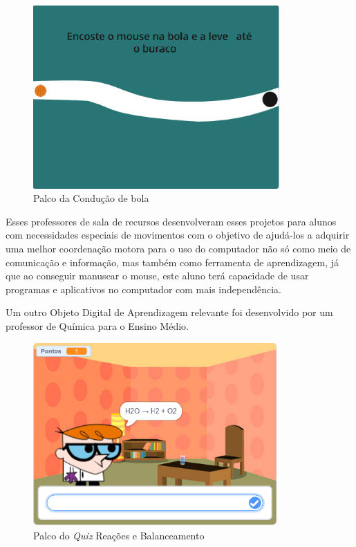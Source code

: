 \documentclass[12pt, openright, a4paper, brazil, english, french, spanish, bibjustif, openany, oneside]{abntex2}
\begin{document}
\begin{figure}[H]

 \centering
 
         \caption{Palco da Condução de bola \label{palcorec2}}
     
         \includegraphics[height=7cm]{palcorec22.png}
        
 
    
\end{figure}

Esses professores de sala de recursos desenvolveram esses projetos para alunos com necessidades especiais de movimentos com o objetivo de ajudá-los a adquirir uma melhor coordenação motora para o uso do computador não só como meio de comunicação e informação, mas também como ferramenta de aprendizagem, já que ao conseguir manusear o mouse, este aluno terá capacidade de usar programas e aplicativos no computador com mais independência.

Um outro Objeto Digital de Aprendizagem relevante foi desenvolvido por um professor de Química para o Ensino Médio. 


\begin{figure}[H]

 \centering
 
         \caption{Palco do \textit{Quiz} Reações e Balanceamento \label{quiz}}
     
         \includegraphics[height=7cm]{quimicatela.png}
        
 
    
\end{figure}
\end{document}
